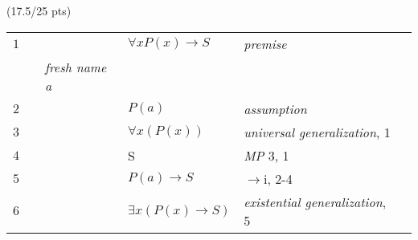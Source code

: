 \documentclass[a4paper,12pt]{article}
\begin{document}
\hfill \small{(17.5/25 pts)}\\
\begin{tcolorbox}

\begin{table}[H]
    \centering
	\begin{tabular}{*6{l}}
	
	
	
	$1$ & & & $\forall xP(x) \rightarrow S$ & \textit{premise} & \\ \cline{1-6}
	
	    & & \textit{fresh name a} & & & \\ \cline{2-5}
	
	$2$ & & & $P(a)$ & \textit{assumption} & \\ 
	
	$3$ & & & $\forall x(P(x))$ & \textit{universal generalization}, 1 & \\
	
	$4$ & & & S & \textit{MP} 3, 1 & \\  \cline{2-5}
	
	$5$ & & & $P(a) \rightarrow S$ & $\rightarrow$i, 2-4 & \\ \cline{1-6}
	
	$6$ & & & $\exists x(P(x) \rightarrow S)$ & \textit{existential generalization}, 5 & \\ 
	
	
\end{tabular}
\end{table}

\end{tcolorbox}
\end{document}
